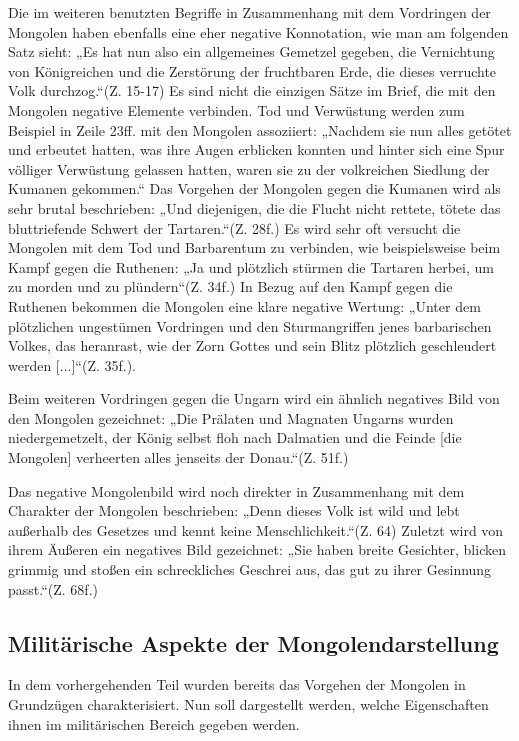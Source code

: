 \documentclass{../../sem_paper}
\begin{document}
Die im weiteren benutzten Begriffe in Zusammenhang mit dem Vordringen der
Mongolen haben ebenfalls eine eher negative Konnotation, wie man am folgenden Satz
sieht: „Es hat nun also ein allgemeines Gemetzel gegeben, die Vernichtung von
Königreichen und die Zerstörung der fruchtbaren Erde, die dieses verruchte Volk
durchzog.“(Z. 15-17) Es sind nicht die einzigen Sätze im Brief, die mit den Mongolen
negative Elemente verbinden. Tod und Verwüstung werden zum Beispiel in Zeile 23ff.
mit den Mongolen assoziiert: „Nachdem sie nun alles getötet und erbeutet hatten, was
ihre Augen erblicken konnten und hinter sich eine Spur völliger Verwüstung gelassen
hatten, waren sie zu der volkreichen Siedlung der Kumanen gekommen.“ Das Vorgehen
der Mongolen gegen die Kumanen wird als sehr brutal beschrieben: „Und diejenigen,
die die Flucht nicht rettete, tötete das bluttriefende Schwert der Tartaren.“(Z. 28f.) Es
wird sehr oft versucht die Mongolen mit dem Tod und Barbarentum zu verbinden, wie
beispielsweise beim Kampf gegen die Ruthenen: „Ja und plötzlich stürmen die Tartaren
herbei, um zu morden und zu plündern“(Z. 34f.) In Bezug auf den Kampf gegen die
Ruthenen bekommen die Mongolen eine klare negative Wertung: „Unter dem
plötzlichen ungestümen Vordringen und den Sturmangriffen jenes barbarischen Volkes,
das heranrast, wie der Zorn Gottes und sein Blitz plötzlich geschleudert werden
[...]“(Z. 35f.).

Beim weiteren Vordringen gegen die Ungarn wird ein ähnlich negatives Bild von den
Mongolen gezeichnet: „Die Prälaten und Magnaten Ungarns wurden niedergemetzelt,
der König selbst floh nach Dalmatien und die Feinde [die Mongolen] verheerten alles
jenseits der Donau.“(Z. 51f.)

Das negative Mongolenbild wird noch direkter in Zusammenhang mit dem Charakter
der Mongolen beschrieben: „Denn dieses Volk ist wild und lebt außerhalb des Gesetzes
und kennt keine Menschlichkeit.“(Z. 64) Zuletzt wird von ihrem Äußeren ein negatives
Bild gezeichnet: „Sie haben breite Gesichter, blicken grimmig und stoßen ein
schreckliches Geschrei aus, das gut zu ihrer Gesinnung passt.“(Z. 68f.)

\subsection{Militärische Aspekte der Mongolendarstellung}
In dem vorhergehenden Teil wurden bereits das Vorgehen der Mongolen in
Grundzügen charakterisiert. Nun soll dargestellt werden, welche Eigenschaften ihnen
im militärischen Bereich gegeben werden.
\end{document}
